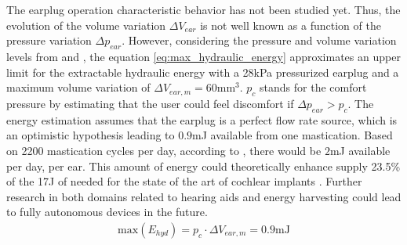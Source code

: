 \documentclass[3p,twocolumn,preprint]{elsarticle}
\begin{document}
The earplug operation characteristic behavior has not been studied yet. Thus, the evolution of the volume variation $\Delta V_{ear}$ is not well known as a function of the pressure variation $\Delta p_{ear}$. However, considering the pressure and volume variation levels from \cite{Delnavaz2012} and \cite{Bouchard-Roy2020}, the equation \ref{eq:max_hydraulic_energy} approximates an upper limit for the extractable hydraulic energy with a 28kPa pressurized earplug and a maximum volume variation of $\Delta V_{ear,m}=60$mm$^3$. $p_c$ stands for the comfort pressure by estimating that the user could feel discomfort if $\Delta p_{ear}>p_c$. The energy estimation assumes that the earplug is a perfect flow rate source, which is an optimistic hypothesis leading to $0.9$mJ available from one mastication. Based on 2200 mastication cycles per day, according to \cite{Goll2011}, there would be $2$mJ available per day, per ear. This amount of energy could theoretically enhance supply 23.5\% of the 17J of needed for the state of the art of cochlear implants \cite{Kulah2022}. Further research in both domains related to hearing aids and energy harvesting could lead to fully autonomous devices in the future.
\begin{align}
	\text{max}(E_{hyd}) = p_c \cdot \Delta V_{ear,m} = 0.9\text{mJ}
	\label{eq:max_hydraulic_energy}
\end{align}

\end{document}
